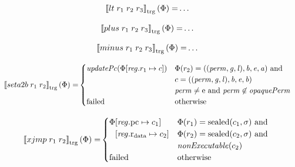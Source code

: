 \documentclass[a4paper]{article}
\newcommand{\sem}[1]{\left\llbracket #1 \right\rrbracket}
\newcommand{\tsem}[2][\Phi]{\sem{#2}_{\mathrm{trg}}(#1)}
\newcommand{\tand}{\text{ and }}
\newcommand{\totherwise}{\text{otherwise }}
\newcommand{\targetcolor}[1]{\color{black}}
\newcommand{\trg}[1]{{\targetcolor{} #1}}
\newcommand{\zinstr}[1]{#1}
\newcommand{\twoinstr}[3]{
  \ifthenelse{\equal{#2#3}{}}
  {\zinstr{#1}}
  {\zinstr{#1} \; #2 \; #3}
}
\newcommand{\threeinstr}[4]{
  \ifthenelse{\equal{#2#3#4}{}}
  {\zinstr{#1}}
  {\zinstr{#1} \; #2 \; #3 \; #4}
}
\newcommand{\txjmp}[2]{\twoinstr{\trg{xjmp}}{#1}{#2}}
\newcommand{\tsetatob}[2]{\twoinstr{\trg{seta2b}}{#1}{#2}}
\newcommand{\tlt}[3]{\threeinstr{\trg{lt}}{#1}{#2}{#3}}
\newcommand{\tplus}[3]{\threeinstr{\trg{plus}}{#1}{#2}{#3}}
\newcommand{\tminus}[3]{\threeinstr{\trg{minus}}{#1}{#2}{#3}}
\newcommand{\update}[2]{[#1 \mapsto #2]}
\newcommand{\shareddom}[1]{\mathrm{#1}}
\newcommand{\perm}{\var{perm}}
\newcommand{\gl}{\var{g}}
\newcommand{\lin}{\var{l}}
\newcommand{\sealed}[1]{\shareddom{sealed}(#1)}
\newcommand{\failed}{\mathrm{failed}}
\newcommand{\var}[1]{\mathit{#1}}
\newcommand{\reg}{\var{reg}}
\newcommand{\baddr}{\var{b}}
\newcommand{\eaddr}{\var{e}}
\newcommand{\aaddr}{\var{a}}
\newcommand{\pcreg}{\mathrm{pc}}
\newcommand{\rdata}{\mathrm{r}_\mathrm{data}}
\newcommand{\plainperm}[1]{\mathrm{#1}}
\newcommand{\enter}{\plainperm{e}}
\newcommand{\plainfun}[2]{
  \ifthenelse{\equal{#2}{}}
  {\mathit{#1}}
  {\mathit{#1}(#2)}
}
\newcommand{\updPcAddr}[1]{\plainfun{updatePc}{#1}}
\newcommand{\nonExec}[1]{\plainfun{nonExecutable}{#1}}
\newcommand{\opaquePerm}[1]{\plainfun{opaquePerm}{#1}}
\begin{document}
\begin{align*}
  \tsem{\tlt{r_1}{r_2}{r_3}} = & \dots
\end{align*}

\begin{align*}
  \tsem{\tplus{r_1}{r_2}{r_3}} = & \dots
\end{align*}

\begin{align*}
  \tsem{\tminus{r_1}{r_2}{r_3}} = & \dots
\end{align*}

\begin{align*}
  \tsem{\tsetatob{r_1}{r_2}} = & 
                                 \begin{cases}
                                   \updPcAddr{\Phi\update{\reg.r_1}{c}} &
                                   \arraycolsep=0pt
                                   \begin{array}[t]{l}
                                     \Phi(r_2) = ((\perm,\gl,\lin),\baddr,\eaddr,\aaddr) \tand \\
                                     c = ((\perm,\gl,\lin),\baddr,\eaddr,\baddr) \\
                                     \perm \neq \enter \tand \perm \not\in \opaquePerm{}
                                   \end{array}
                                   \\
                                   \failed & \totherwise
                                 \end{cases}
\end{align*}

\begin{align*}
  \tsem{\txjmp{r_1}{r_2}} = & 
                              \begin{cases}
                                \Phi
                                \arraycolsep=0pt
                                \begin{array}[t]{l}
                                  \update{\reg.\pcreg}{c_1} \\
                                  \update{\reg.\rdata}{c_2}
                                \end{array} & 
                                \arraycolsep=0pt
                                \begin{array}[t]{l}
                                  \Phi(r_1) = \sealed{c_1,\sigma} \text{ and } \\
                                  \Phi(r_2) = \sealed{c_2,\sigma} \text{ and } \\
                                  \nonExec{c_2}
                                \end{array}
\\
\failed & \text{otherwise}
                              \end{cases}
\end{align*}
\end{document}
